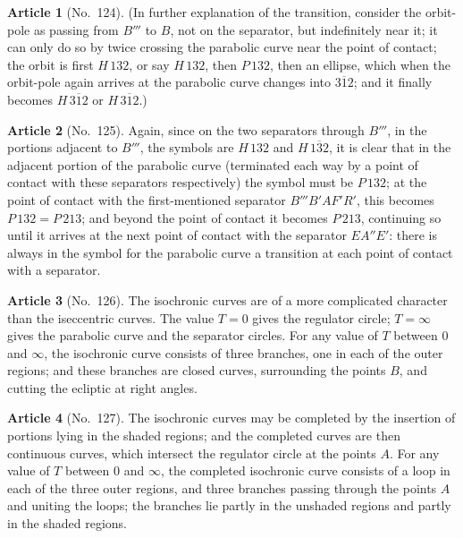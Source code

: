 \documentclass[11pt,a4paper]{article}
\theoremstyle{definition}
\newtheorem{art}{Article}
\begin{document}
\begin{art}[No.~124]
(In further explanation of the transition, consider the orbit-pole as passing from $B'''$ to $B$, not on the separator, but indefinitely near it; it can only do so by twice crossing the parabolic curve near the point of contact; the orbit is first $H\,132$, or say $H\,132$, then $P\,132$, then an ellipse, which when the orbit-pole again arrives at the parabolic curve changes into $\overline{312}$; and it finally becomes $H\,\overline{312}$ or $H\,\overline{312}$.)
\end{art}

\begin{art}[No.~125]
Again, since on the two separators through $B'''$, in the portions adjacent to $B'''$, the symbols are $H\,132$ and $H\,\overline{132}$, it is clear that in the adjacent portion of the parabolic curve (terminated each way by a point of contact with these separators respectively) the symbol must be $P\,132$; at the point of contact with the first-mentioned separator $B'''B'AF'R'$, this becomes $P\,132 = P\,213$; and beyond the point of contact it becomes $P\,213$, continuing so until it arrives at the next point of contact with the separator $EA''E'$: there is always in the symbol for the parabolic curve a transition at each point of contact with a separator.
\end{art}

\begin{art}[No.~126]
The isochronic curves are of a more complicated character than the iseccentric curves. The value $T = 0$ gives the regulator circle; $T = \infty$ gives the parabolic curve and the separator circles. For any value of $T$ between $0$ and $\infty$, the isochronic curve consists of three branches, one in each of the outer regions; and these branches are closed curves, surrounding the points $B$, and cutting the ecliptic at right angles.
\end{art}

\begin{art}[No.~127]
The isochronic curves may be completed by the insertion of portions lying in the shaded regions; and the completed curves are then continuous curves, which intersect the regulator circle at the points $A$. For any value of $T$ between $0$ and $\infty$, the completed isochronic curve consists of a loop in each of the three outer regions, and three branches passing through the points $A$ and uniting the loops; the branches lie partly in the unshaded regions and partly in the shaded regions.
\end{art}
\end{document}
